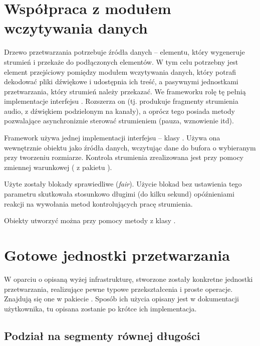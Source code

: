 \section{Współpraca z modułem wczytywania danych}

Drzewo przetwarzania potrzebuje źródła danych -- elementu, który wygeneruje strumień i przekaże do
podłączonych elementów. W tym celu potrzebny jest element przejściowy pomiędzy modułem wczytywania
danych, który potrafi dekodować pliki dźwiękowe i udostępnia ich treść, a pasywnymi jednostkami
przetwarzania, który strumień należy przekazać. We frameworku rolę tę pełnią implementacje
interfejsu . Rozszerza on  (tj. produkuje
fragmenty strumienia audio, z dźwiękiem podzielonym na kanały), a oprócz tego posiada metody
pozwalające asynchroniznie sterować strumieniem (pauza, wznowienie itd).

Framework używa jednej implementacji interfejsu  -- klasy
. Używa ona wewnętrznie obiektu  jako źródła danych,
wczytując dane do bufora o wybieranym przy tworzeniu rozmiarze. Kontrola strumienia zrealizowana
jest przy pomocy zmiennej warunkowej ( z pakietu ).

\begin{Note}
  Użyte zostały blokady sprawiedliwe (\textit{fair}). Użycie blokad bez ustawienia tego parametru
  skutkowała stosunkowo długimi (do kilku sekund) opóźnieniami reakcji na wywołania metod
  kontrolujących pracę strumienia.
\end{Note}

Obiekty  utworzyć można przy pomocy metody  z klasy
.


\section{Gotowe jednostki przetwarzania}

W oparciu o opisaną wyżej infrastrukturę, stworzone zostały konkretne jednostki przetwarzania,
realizujące pewne typowe przekształcenia i proste operacje. Znajdują się one w pakiecie
. Sposób ich użycia opisany jest w dokumentacji użytkownika, tu
opisana zostanie po krótce ich implementacja.


\subsection{Podział na segmenty równej długości}

